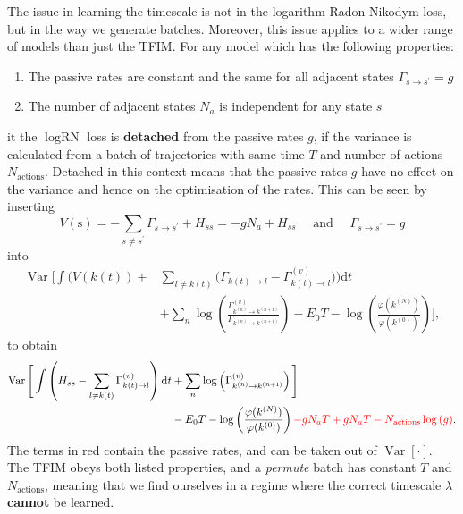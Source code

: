 The issue in learning the timescale is not in the logarithm Radon-Nikodym loss, but in the way we generate batches. Moreover, this issue applies to a wider range of models than just the TFIM. For any model which has the following properties:
\begin{enumerate}
	\item The passive rates are constant and the same for all adjacent states $\Gamma_{s \rightarrow s^{\prime}}=g$
	\item The number of adjacent states $N_a$ is independent for any state $s$
\end{enumerate}
it the $\log \text{RN}$ loss is \textbf{detached} from the passive rates $g$, if the variance is calculated from a batch of trajectories with same time $T$ and number of actions $N_{\text{actions}}$. Detached in this context means that the passive rates $g$ have no effect on the variance and hence on the optimisation of the rates. This can be seen by inserting 
\begin{equation}
	V(\mathrm{s})=-\sum_{s \neq s^{\prime}} \Gamma_{s \rightarrow s^{\prime}}+H_{s s}=-g N_a + H_{s s} \quad \text{ and } \quad \Gamma_{s \rightarrow s^{\prime}}=g
\end{equation}
into
\begin{equation}
	\begin{aligned}
			{\operatorname{Var}}\Bigg[\int\bigg(V(k(t))+&\sum_{l \neq k(t)}\bigg(\Gamma_{k(t) \rightarrow l}-\Gamma_{k(t) \rightarrow l}^{(v)}\bigg)\bigg) \mathrm{d} t \\
		&+\sum_{n} \log \left(\frac{\Gamma_{k^{(n)} \rightarrow k^{(n+1)}}^{(v)}}{\Gamma_{k^{(n)} \rightarrow k^{(n+1)}}}\right)-E_{0} T-\log \left(\frac{\varphi(k^{(N)})}{\varphi(k^{(0)})}\right)
		\Bigg],
	\end{aligned}
\end{equation}
to obtain
\begin{equation}
	\begin{aligned}
		\operatorname{Var}\Bigg[\int\left(H_{s s}-\sum_{l \neq k(t)}\Gamma_{k(t) \rightarrow l}^{(v)}\right)\mathrm{d} t 
		&+ \sum_{n} \log \left(\Gamma_{k^{(n)} \rightarrow k^{(n+1)}}^{(v)}\right)\Bigg] \\ &-E_{0} T -\log \left(\frac{\varphi(k^{(N)})}{\varphi(k^{(0)})}\right) \textcolor{red}{- gN_aT + gN_aT - N_{\text{actions}}\log{(g)}}.
	\end{aligned}
\end{equation}
The terms in red contain the passive rates, and can be taken out of $\operatorname{Var}[\cdot]$. The TFIM obeys both listed properties, and a \emph{permute} batch has constant $T$ and $N_{\text{actions}}$, meaning that we find ourselves in a regime where the correct timescale $\lambda$ \textbf{cannot} be learned. 

